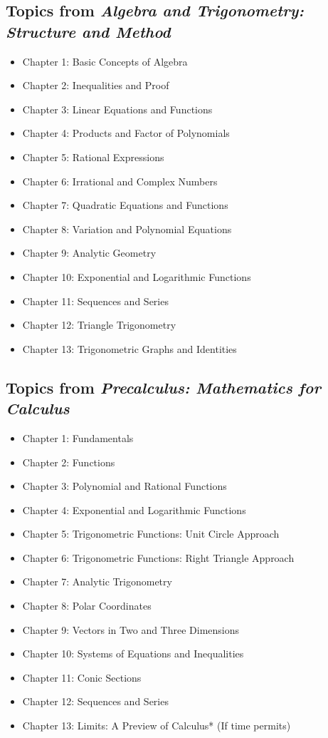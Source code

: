 \documentclass[11pt, letterpaper]{article}
\begin{document}
\subsection*{Topics from \textit{Algebra and Trigonometry: Structure and Method}}
\begin{itemize}
    \item Chapter 1: Basic Concepts of Algebra
    \item Chapter 2: Inequalities and Proof
    \item Chapter 3: Linear Equations and Functions
    \item Chapter 4: Products and Factor of Polynomials
    \item Chapter 5: Rational Expressions
    \item Chapter 6: Irrational and Complex Numbers
    \item Chapter 7: Quadratic Equations and Functions
    \item Chapter 8: Variation and Polynomial Equations
    \item Chapter 9: Analytic Geometry
    \item Chapter 10: Exponential and Logarithmic Functions
    \item Chapter 11: Sequences and Series
    \item Chapter 12: Triangle Trigonometry
    \item Chapter 13: Trigonometric Graphs and Identities
\end{itemize}

\subsection*{Topics from \textit{Precalculus: Mathematics for Calculus}}
\begin{itemize}
    \item Chapter 1: Fundamentals
    \item Chapter 2: Functions
    \item Chapter 3: Polynomial and Rational Functions
    \item Chapter 4: Exponential and Logarithmic Functions
    \item Chapter 5: Trigonometric Functions: Unit Circle Approach
    \item Chapter 6: Trigonometric Functions: Right Triangle Approach
    \item Chapter 7: Analytic Trigonometry
    \item Chapter 8: Polar Coordinates
    \item Chapter 9: Vectors in Two and Three Dimensions
    \item Chapter 10: Systems of Equations and Inequalities
    \item Chapter 11: Conic Sections
    \item Chapter 12: Sequences and Series
    \item Chapter 13: Limits: A Preview of Calculus* (If time permits)
\end{itemize}
\end{document}
